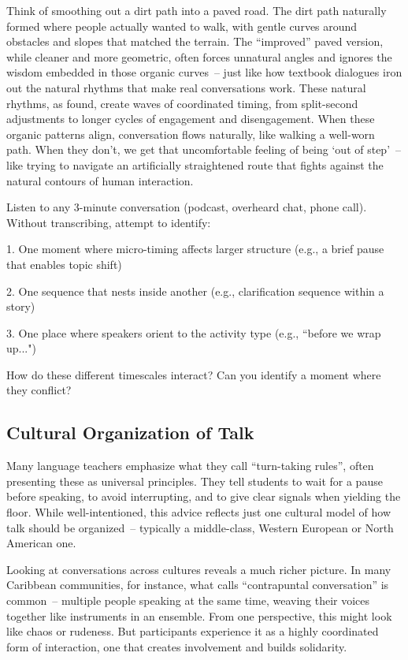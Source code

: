 Think of smoothing out a dirt path into a paved road. The dirt path naturally formed where people actually wanted to walk, with gentle curves around obstacles and slopes that matched the terrain. The ``improved'' paved version, while cleaner and more geometric, often forces unnatural angles and ignores the wisdom embedded in those organic curves~-- just like how textbook dialogues iron out the natural rhythms that make real conversations work. These natural rhythms, as \citet{wilson2005} found, create waves of coordinated timing, from split-second adjustments to longer cycles of engagement and disengagement. When these organic patterns align, conversation flows naturally, like walking a well-worn path. When they don't, we get that uncomfortable feeling of being `out of step'~-- like trying to navigate an artificially straightened route that fights against the natural contours of human interaction.

\begin{tcolorbox}[title=Exercise: Mapping Temporal Layers, colback=white, colframe=blue!75!black, fonttitle=\bfseries]
Listen to any 3-minute conversation (podcast, overheard chat, phone call). Without transcribing, attempt to identify:

1. One moment where micro-timing affects larger structure (e.g., a brief pause that enables topic shift)

2. One sequence that nests inside another (e.g., clarification sequence within a story)

3. One place where speakers orient to the activity type (e.g., ``before we wrap up...")

How do these different timescales interact? Can you identify a moment where they conflict?
\end{tcolorbox}

\subsection{Cultural Organization of Talk} \label{subsec:cultural-org}

Many language teachers emphasize what they call ``turn-taking rules'', often presenting these as universal principles. They tell students to wait for a pause before speaking, to avoid interrupting, and to give clear signals when yielding the floor. While well-intentioned, this advice reflects just one cultural model of how talk should be organized~-- typically a middle-class, Western European or North American one.

Looking at conversations across cultures reveals a much richer picture. In many Caribbean communities, for instance, what \citet{reisman1974} calls ``contrapuntal conversation'' is common~-- multiple people speaking at the same time, weaving their voices together like instruments in an ensemble. From one perspective, this might look like chaos or rudeness. But participants experience it as a highly coordinated form of interaction, one that creates involvement and builds solidarity.

